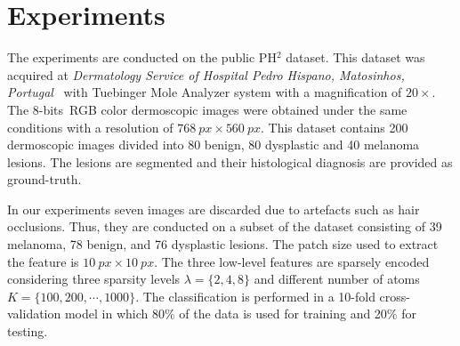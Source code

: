 \section{Experiments}
\label{sec:exp}
The experiments are conducted on the public PH$^2$ dataset.
This dataset was acquired at \textit{Dermatology Service of Hospital Pedro Hispano, Matosinhos, Portugal}~\cite{mendoncca2013ph} with Tuebinger Mole Analyzer system with a magnification of $20 \times$.
The 8-bits~RGB color dermoscopic images were obtained under the same conditions with a resolution of $\SI{768}{px} \times \SI{560}{px}$. 
This dataset contains 200 dermoscopic images divided into 80 benign, 80 dysplastic and 40 melanoma lesions. 
The lesions are segmented and their histological diagnosis are provided as ground-truth. 

In our experiments seven images are discarded due to artefacts such as hair occlusions.
Thus, they are conducted on a subset of the dataset consisting of 39 melanoma, 78 benign, and 76 dysplastic lesions.
The patch size used to extract the feature is $\SI{10}{px} \times \SI{10}{px}$.
The three low-level features are sparsely encoded considering three sparsity levels $\lambda=\{2,4,8\}$ and different number of atoms $K = \{100, 200, \cdots, 1000\}$.
The classification is performed in a 10-fold cross-validation model in which 80\% of the data is used for training and 20\% for testing. 
 